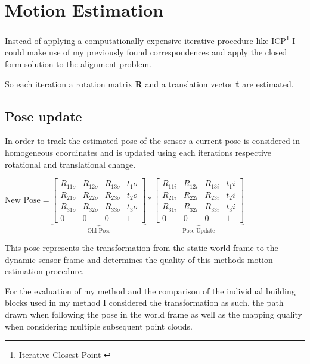 \chapter{Motion Estimation}\label{ch:motion_estimation}

Instead of applying a computationally expensive iterative procedure like ICP\footnote{Iterative Closest Point \citep{Pomerleau}} I could make use of my previously found correspondences and apply the closed form solution\citep{closed_form} to the alignment problem.

So each iteration a rotation matrix \textbf{R} and a translation vector \textbf{t} are estimated.

\section{Pose update}{
    In order to track the estimated pose of the sensor a current pose is considered in homogeneous coordinates and is updated using each iterations respective rotational and translational change.

    \begin{center}
        $\text{New Pose} = 
        \underbrace{\begin{bmatrix}
            R_{11o} & R_{12o} & R_{13o} & t_1o\\
            R_{21o} & R_{22o} & R_{23o} & t_2o\\
            R_{31o} & R_{32o} & R_{33o} & t_3o\\
            0&0&0&1
        \end{bmatrix}}_{\text{Old Pose}} * 
        \underbrace{\begin{bmatrix}
            R_{11i} & R_{12i} & R_{13i} & t_1i\\
            R_{21i} & R_{22i} & R_{23i} & t_2i\\
            R_{31i} & R_{32i} & R_{33i} & t_3i\\
            0&0&0&1
        \end{bmatrix}}_{\text{Pose Update}}
        $
    \end{center}

    This pose represents the transformation from the static world frame to the dynamic sensor frame and determines the quality of this methods motion estimation procedure.
    
    For the evaluation of my method and the comparison of the individual building blocks used in my method I considered the transformation as such, the path drawn when following the pose in the world frame as well as the mapping quality when considering multiple subsequent point clouds. 
}






